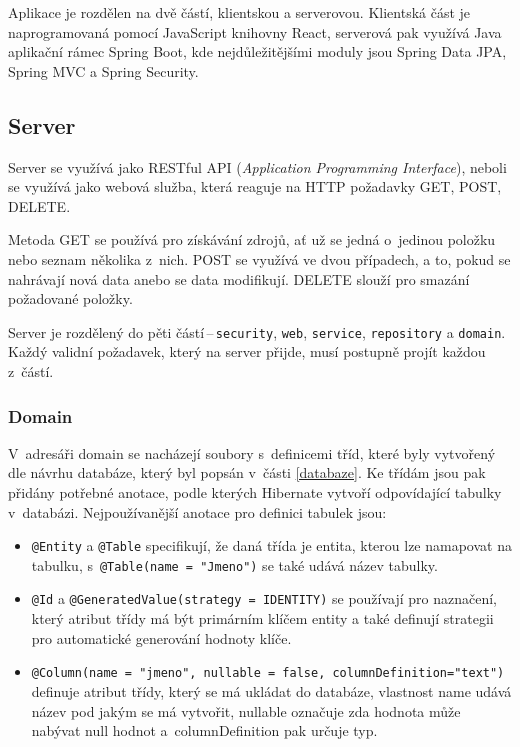 Aplikace je rozdělen na dvě částí, klientskou a serverovou. Klientská část je naprogramovaná pomocí JavaScript knihovny React, serverová pak využívá Java aplikační rámec Spring Boot, kde nejdůležitějšími moduly jsou Spring Data JPA, Spring MVC a Spring Security.

\subsection{Server}

Server se využívá jako RESTful API (\textit{Application Programming Interface}), neboli se využívá jako webová služba, která reaguje na HTTP požadavky GET, POST, DELETE.

Metoda GET se používá pro získávání zdrojů, ať už se jedná o~jedinou položku nebo seznam několika z~nich. POST se využívá ve dvou případech, a to, pokud se nahrávají nová data anebo se data modifikují. DELETE slouží pro smazání požadované položky.

Server je rozdělený do pěti částí\,--\,\texttt{security}, \texttt{web}, \texttt{service}, \texttt{repository} a \texttt{domain}. Každý validní požadavek, který na server přijde, musí postupně projít každou z~částí.

\subsubsection *{Domain}

V~adresáři domain se nacházejí soubory s~definicemi tříd, které byly vytvořený dle návrhu databáze, který byl popsán v~části \ref{databaze}. Ke třídám jsou pak přidány potřebné anotace, podle kterých Hibernate vytvoří odpovídající tabulky v~databázi. Nejpoužívanější anotace pro definici tabulek jsou: 

\begin{itemize}
    \item \texttt{@Entity} a \texttt{@Table} specifikují, že daná třída je entita, kterou lze namapovat na tabulku, s~\texttt{@Table(name = "Jmeno")} se také udává název tabulky.
    \item \texttt{@Id} a \texttt{@GeneratedValue(strategy = IDENTITY)} se používají pro naznačení, který atribut třídy má být primárním klíčem entity a také definují strategii pro automatické generování hodnoty klíče.
    \item\texttt{@Column(name = "jmeno", nullable = false, columnDefinition="text")} definuje atribut třídy, který se má ukládat do databáze, vlastnost name udává název pod jakým se má vytvořit, nullable označuje zda hodnota může nabývat null hodnot a~columnDefinition pak určuje typ.
\end{itemize}

